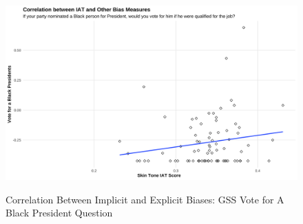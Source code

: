 \documentclass[12pt, fullpage]{article}
\begin{document}
\begin{center}
\begin{figure}[H]
\caption{Correlation Between Implicit and Explicit Biases: GSS Vote for A Black President Question}
\includegraphics[width=\textwidth]{figure/ImplicitVoteBlk_scatter.png} 
\label{fig:cor-bias-gss-blkpres}
\end{figure}
\end{center}

\newpage
\pagebreak
\end{document}
